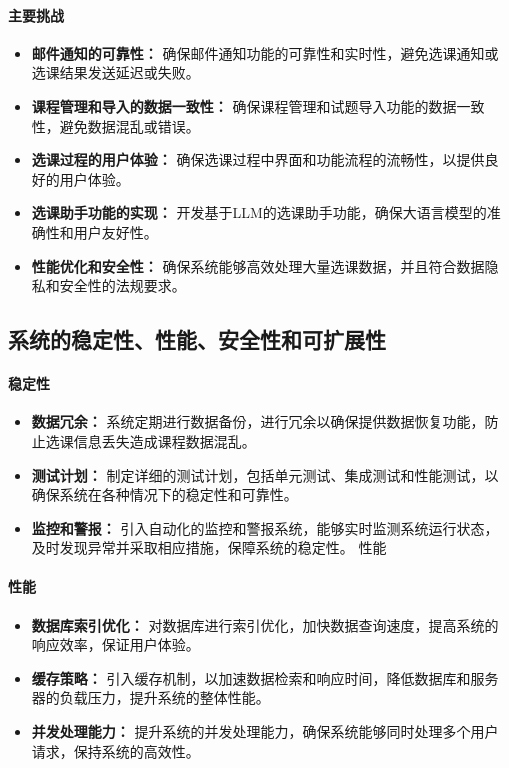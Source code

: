 \documentclass{article}
\begin{document}
\paragraph{主要挑战}
\begin{itemize}
	\item \textbf{邮件通知的可靠性：}  确保邮件通知功能的可靠性和实时性，避免选课通知或选课结果发送延迟或失败。
	\item \textbf{课程管理和导入的数据一致性：} 确保课程管理和试题导入功能的数据一致性，避免数据混乱或错误。
	\item \textbf{选课过程的用户体验：} 确保选课过程中界面和功能流程的流畅性，以提供良好的用户体验。
	\item \textbf{选课助手功能的实现：} 开发基于LLM的选课助手功能，确保大语言模型的准确性和用户友好性。
	\item \textbf{性能优化和安全性：} 确保系统能够高效处理大量选课数据，并且符合数据隐私和安全性的法规要求。
\end{itemize}

\subsection{系统的稳定性、性能、安全性和可扩展性}
\paragraph{稳定性}
\begin{itemize}
	\item \textbf{数据冗余：}  系统定期进行数据备份，进行冗余以确保提供数据恢复功能，防止选课信息丢失造成课程数据混乱。
	\item \textbf{测试计划：} 制定详细的测试计划，包括单元测试、集成测试和性能测试，以确保系统在各种情况下的稳定性和可靠性。
	\item \textbf{监控和警报：} 引入自动化的监控和警报系统，能够实时监测系统运行状态，及时发现异常并采取相应措施，保障系统的稳定性。
	性能
\end{itemize}

\paragraph{性能}
\begin{itemize}
	\item \textbf{数据库索引优化：}  对数据库进行索引优化，加快数据查询速度，提高系统的响应效率，保证用户体验。
	\item \textbf{缓存策略：} 引入缓存机制，以加速数据检索和响应时间，降低数据库和服务器的负载压力，提升系统的整体性能。
	\item \textbf{并发处理能力：} 提升系统的并发处理能力，确保系统能够同时处理多个用户请求，保持系统的高效性。
\end{itemize}
\end{document}
